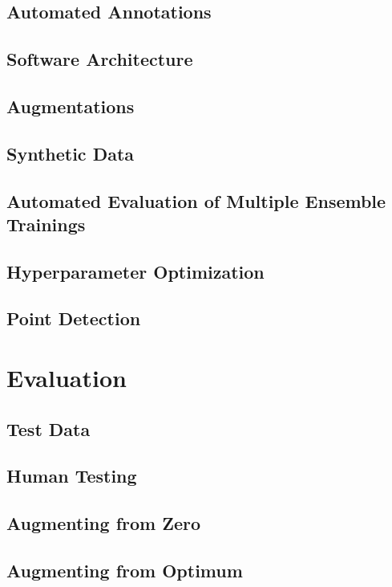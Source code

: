 \documentclass[10pt]{book}
\begin{document}
\section{Automated Annotations}

\section{Software Architecture}

\section{Augmentations}

\section{Synthetic Data}

\section{Automated Evaluation of Multiple Ensemble Trainings}

\section{Hyperparameter Optimization}

\section{Point Detection}

\chapter{Evaluation}
\label{chap:eval}

\section{Test Data}

\section{Human Testing}

\section{Augmenting from Zero}

\section{Augmenting from Optimum}
\end{document}
